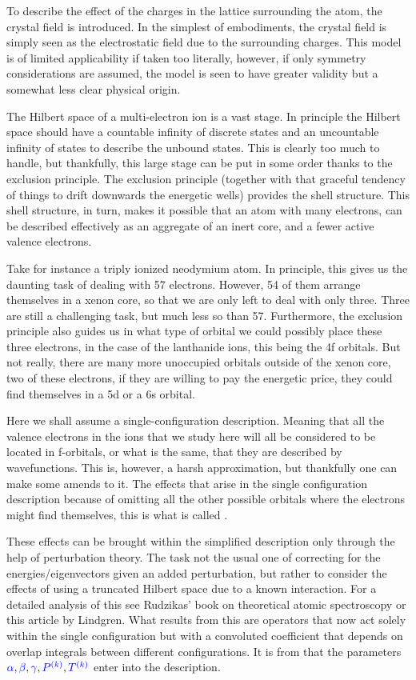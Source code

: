 \documentclass{article}
\begin{document}
To describe the effect of the charges in the lattice surrounding the atom, the crystal field is introduced. In the simplest of embodiments, the crystal field is simply seen as the electrostatic field due to the surrounding charges. This model is of limited applicability if taken too literally, however, if only symmetry considerations are assumed, the model is seen to have greater validity but a somewhat less clear physical origin.

The Hilbert space of a multi-electron ion is a vast stage. In principle the Hilbert space should have a countable infinity of discrete states and an uncountable infinity of states to describe the unbound states. This is clearly too much to handle, but thankfully, this large stage can be put in some order thanks to the exclusion principle. The exclusion principle (together with that graceful tendency of things to drift downwards the energetic wells) provides the shell structure. This shell structure, in turn, makes it possible that an atom with many electrons, can be described effectively as an aggregate of an inert core, and a fewer active valence electrons.  

Take for instance a triply ionized neodymium atom. In principle, this gives us the daunting task of dealing with 57 electrons. However, 54 of them arrange themselves in a xenon core, so that we are only left to deal with only three. Three are still a challenging task, but much less so than  57. Furthermore, the exclusion principle also guides us in what type of orbital we could possibly place these three electrons, in the case of the lanthanide ions, this being the 4f orbitals. But not really, there are many more unoccupied orbitals outside of the xenon core, two of these electrons, if they are willing to pay the energetic price, they could find themselves in a 5d or a 6s orbital.  

Here we shall assume a single-configuration description. Meaning that all the valence electrons in the ions that we study here will all be considered to be located in f-orbitals, or what is the same, that they are described by \fn wavefunctions. This is, however, a harsh approximation, but thankfully one can make some amends to it. The effects that arise in the single configuration description because of omitting all the other possible orbitals where the electrons might find themselves, this is what is called \confint.  

These effects can be brought within the simplified description only through the help of perturbation theory. The task not the usual one of correcting for the energies/eigenvectors given an added perturbation, but rather to consider the effects of using a truncated Hilbert space due to a known interaction. For a detailed analysis of this see Rudzikas' \cite{rudzikas_theoretical_2007} book on theoretical atomic spectroscopy or this article \cite{lindgren_rayleigh-schrodinger_1974} by Lindgren. What results from this are operators that now act solely within the single configuration but with a convoluted coefficient that depends on overlap integrals between different configurations. It is from \confint that the parameters $\textcolor{blue}{{\alpha}}, \textcolor{blue}{{\beta}}, \textcolor{blue}{{\gamma}}, \textcolor{blue}{P^{(k)}}, \textcolor{blue}{T^{(k)}}$ enter into the description.
\end{document}
